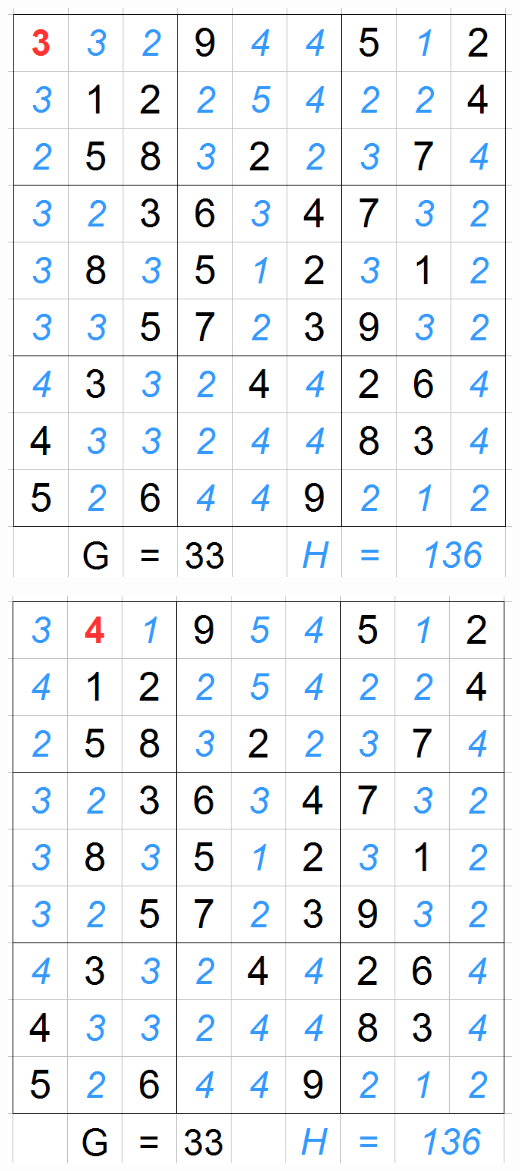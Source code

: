 \begin{frame}
\begin{minipage}{.45\textwidth}
\end{minipage}\hfill
\begin{minipage}{.45\textwidth}

\includegraphics[scale=0.2]{images/ASTARExample/1_1.png}

\includegraphics[scale=0.2]{images/ASTARExample/1_4.png}

\end{minipage}

\end{frame}

